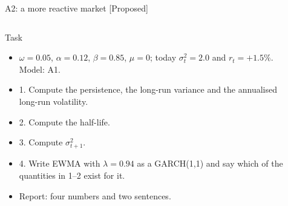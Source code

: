\begin{frame}{A2: a more reactive market [Proposed]}
\propsub
\itemsize{\scriptsize}
\begin{columns}[T]
\begin{column}{\taskw}
\begin{block}{Task}
\begin{itemize}
    \item $\omega = 0.05$, $\alpha = 0.12$, $\beta = 0.85$, $\mu = 0$; today $\sigma_t^2 = 2.0$ and $r_t = +1.5\%$. Model: A1.
    \item 1. Compute the persistence, the long-run variance and the annualised long-run volatility.
    \item 2. Compute the half-life.
    \item 3. Compute $\sigma_{t+1}^2$.
    \item 4. Write EWMA with $\lambda = 0.94$ as a GARCH(1,1) and say which of the quantities in 1--2 exist for it.
    \item Report: four numbers and two sentences.
\end{itemize}
\end{block}
\end{column}
\begin{column}{\solw}
\end{column}
\end{columns}
\end{frame}

